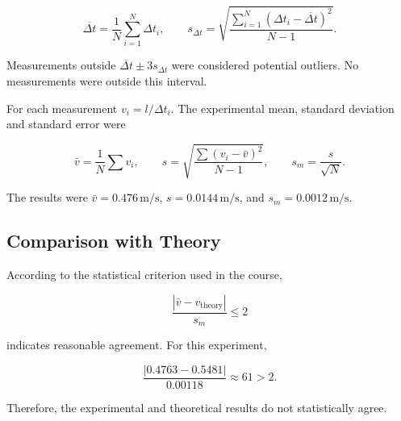 \documentclass[12pt,a4paper]{article}
\begin{document}
{\[
\overline{\Delta t}
=
\frac{1}{N}\sum_{i=1}^{N}\Delta t_i,
\qquad
s_{\Delta t}
=
\sqrt{
\frac{
\sum_{i=1}^{N}
(\Delta t_i-\overline{\Delta t})^2
}{
N-1
}
}.
\]

Measurements outside
\(\overline{\Delta t}\pm3s_{\Delta t}\)
were considered potential outliers. No measurements were outside this interval.

For each measurement \(v_i=l/\Delta t_i\). The experimental mean, standard deviation and standard error were

\[
\bar v=\frac{1}{N}\sum v_i,
\qquad
s=
\sqrt{
\frac{\sum(v_i-\bar v)^2}{N-1}
},
\qquad
s_m=\frac{s}{\sqrt N}.
\]

The results were
\(\bar v=0.476\,\mathrm{m/s}\),
\(s=0.0144\,\mathrm{m/s}\), and
\(s_m=0.0012\,\mathrm{m/s}\).

\subsection{Comparison with Theory}
\label{app:comparison}

According to the statistical criterion used in the course,

\[
\frac{|\bar v-v_{\mathrm{theory}}|}{s_m}\le2
\]

indicates reasonable agreement. For this experiment,

\[
\frac{|0.4763-0.5481|}{0.00118}
\approx61>2.
\]

Therefore, the experimental and theoretical results do not statistically agree.

}
\end{document}

